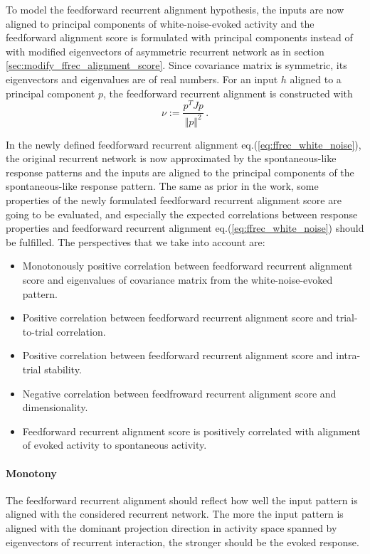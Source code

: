 \documentclass[11pt]{article}
\begin{document}
	To model the feedforward recurrent alignment hypothesis, the inputs are now aligned to principal components of white-noise-evoked activity and the feedforward alignment score is formulated with principal components instead of with modified eigenvectors of asymmetric recurrent network as in section \ref{sec:modify_ffrec_alignment_score}. Since covariance matrix is symmetric, its eigenvectors and eigenvalues are of real numbers. For an input $h$ aligned to a principal component $p$, the feedforward recurrent alignment is constructed with 
		\begin{equation} \label{eq:ffrec_white_noise}
			\nu := \frac{p^T J p}{\Vert p \Vert^2} \, .
		\end{equation}
	
	In the newly defined feedforward recurrent alignment eq.(\ref{eq:ffrec_white_noise}), the original recurrent network is now approximated by the spontaneous-like response patterns and the inputs are aligned to the principal components of the spontaneous-like response pattern. The same as prior in the work, some properties of the newly formulated feedforward recurrent alignment score are going to be evaluated, and especially the expected correlations between response properties and feedforward recurrent alignment eq.(\ref{eq:ffrec_white_noise}) should be fulfilled. The perspectives that we take into account are:
		\begin{itemize}
			\item Monotonously positive correlation between feedforward recurrent alignment score and eigenvalues of covariance matrix from the white-noise-evoked pattern.
			\item Positive correlation between feedforward recurrent alignment score and trial-to-trial correlation.
			\item Positive correlation between feedforward recurrent alignment score and intra-trial stability.
			\item Negative correlation between feedfroward recurrent alignment score and dimensionality.
			\item Feedforward recurrent alignment score is positively correlated with alignment of evoked activity to spontaneous activity.
		\end{itemize}
	
	\paragraph{Monotony} The feedforward recurrent alignment should reflect how well the input pattern is aligned with the considered recurrent network. The more the input pattern is aligned with the dominant projection direction in activity space spanned by eigenvectors of recurrent interaction, the stronger should be the evoked response. %
	
\end{document}
